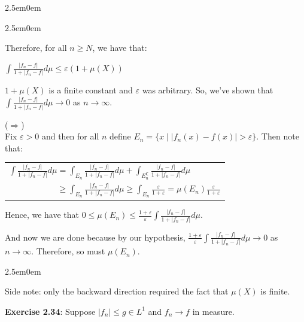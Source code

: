 \documentclass{book}
\newcommand{\exPPP}{%
   \color{VioletRed}%
   \fontsize{12}{14}\selectfont%
}
\newenvironment{myIndent}{%
   \begin{adjustwidth}{2.5em}{0em}%
}{%
   \end{adjustwidth}%
}
\newcommand{\blab}[1]{\textbf{#1}}
\newcommand{\comp}{\mathsf{C}}
\newcommand{\retTwo}{\hfill\bigbreak}
\begin{document}
\begin{myIndent}
\begin{myIndent}
		Therefore, for all $n \geq N$, we have that:

		{\center $\int \frac{|f_n - f|}{1 + |f_n - f|}d\mu \leq \varepsilon( 1 + \mu(X))$ \retTwo\par}

		$1 + \mu(X)$ is a finite constant and $\varepsilon$ was arbitrary. So, we've shown that\\ $\int \frac{|f_n - f|}{1 + |f_n - f|}d\mu \rightarrow 0$ as $n \rightarrow \infty$.\retTwo

		($\Longrightarrow$)\\
		Fix $\varepsilon > 0$ and then for all $n$ define $E_n = \{x \mid |f_n(x) - f(x)| > \varepsilon\}$. Then note that:

		{\centering\begin{tabular}{l}
			$\int \frac{|f_n-f|}{1 + |f_n-f|}d\mu = \int_{E_n}\frac{|f_n-f|}{1 + |f_n-f|}d\mu + \int_{E_n^{\comp}}\frac{|f_n-f|}{1 + |f_n-f|}d\mu$\\ [8pt]

			$\phantom{\int \frac{|f_n-g|}{1 + |f_n-f|}d\mu} \geq \int_{E_n}\frac{|f_n-f|}{1 + |f_n-f|}d\mu \geq \int_{E_n} \frac{\varepsilon}{1 + \varepsilon} = \mu(E_n)\frac{\varepsilon}{1 + \varepsilon}$
		\end{tabular} \retTwo\par}

		Hence, we have that $0 \leq \mu(E_n) \leq \frac{1 + \varepsilon}{\varepsilon}\int \frac{|f_n-f|}{1 + |f_n-f|}d\mu$.\retTwo

		And now we are done because by our hypothesis, $\frac{1 + \varepsilon}{\varepsilon}\int \frac{|f_n-f|}{1 + |f_n-f|}d\mu \rightarrow 0$ as $n \rightarrow \infty$. Therefore, so must $\mu(E_n)$.
		
		\begin{myIndent}\exPPP
			Side note: only the backward direction required the fact that $\mu(X)$ is finite.\retTwo
		\end{myIndent}
	\end{myIndent}
\end{myIndent}

\blab{Exercise 2.34}: Suppose $|f_n| \leq g \in L^1$ and $f_n \rightarrow f$ in measure.
\end{document}
